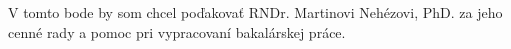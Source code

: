 V tomto bode by som chcel poďakovať RNDr. Martinovi Nehézovi, PhD. za jeho cenné rady a pomoc pri vypracovaní bakalárskej práce.